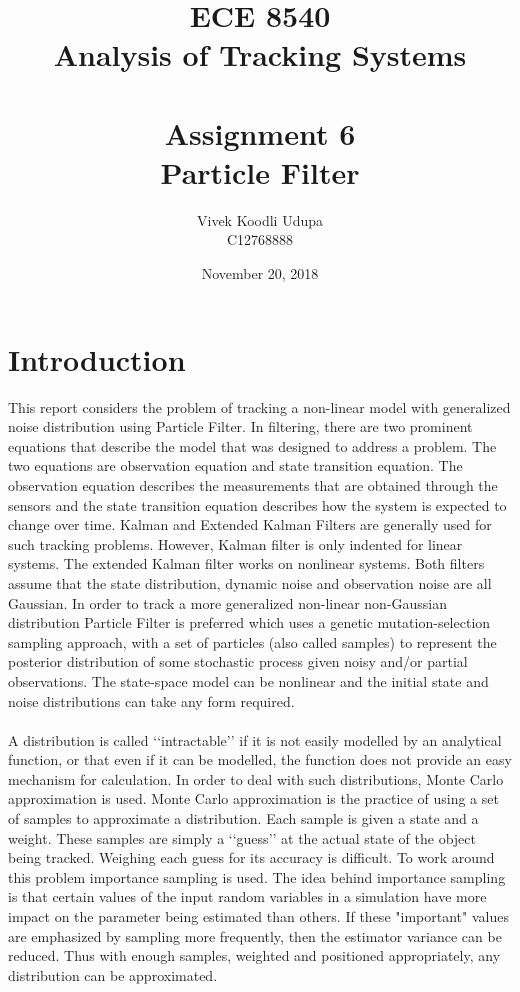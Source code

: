 \documentclass[12pt]{article}
\title{ECE 8540 \\ Analysis of Tracking Systems \\ \quad \\
	Assignment 6 \\ Particle Filter}
\author{Vivek Koodli Udupa \\ C12768888}
\date{November 20, 2018 }
\begin{document}
\begin{mdframed}
\maketitle
\end{mdframed}


\section{Introduction}
This report considers the problem of tracking a non-linear model with generalized noise distribution using Particle Filter. In filtering, there are two prominent equations that describe the model that was designed to address a problem. The two equations are observation equation and state transition equation. The observation equation describes the measurements that are obtained through the sensors and the state transition equation describes how the system is expected to change over time. Kalman and Extended Kalman Filters are generally used for such tracking problems. However, Kalman filter is only indented for linear systems. The extended Kalman filter works on nonlinear systems. Both filters assume that the state distribution, dynamic noise and observation noise are all Gaussian. In order to track a more generalized non-linear non-Gaussian distribution Particle Filter is preferred which uses a genetic mutation-selection sampling approach, with a set of particles (also called samples) to represent the posterior distribution of some stochastic process given noisy and/or partial observations. The state-space model can be nonlinear and the initial state and noise distributions can take any form required.\\ 
\\ \indent
A distribution is called \lq\lq{intractable}\rq\rq{} if it is not easily modelled by an analytical function, or that even if it can be modelled, the function does not provide an easy mechanism for calculation. In order to deal with such distributions, Monte Carlo approximation is used. Monte Carlo approximation is the practice of using a set of samples to approximate a distribution. Each sample is given a state and a weight. These samples are simply a \lq\lq{guess}\rq\rq{} at the actual state of the object being tracked. Weighing each guess for its accuracy is difficult. To work around this problem importance sampling is used. The idea behind importance sampling is that certain values of the input random variables in a simulation have more impact on the parameter being estimated than others. If these "important" values are emphasized by sampling more frequently, then the estimator variance can be reduced. Thus with enough samples, weighted and positioned appropriately, any distribution can be approximated.  \\ 
\end{document}
